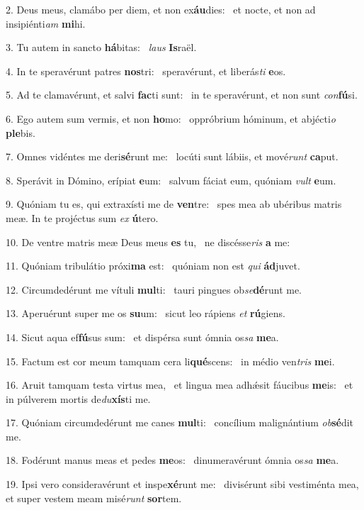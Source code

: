2. Deus meus, clamábo per diem, et non ex\textbf{áu}dies: \ast\  et nocte, et non ad insipiénti\textit{am} \textbf{mi}hi.\

3. Tu autem in sancto \textbf{há}bitas: \ast\  \textit{laus} \textbf{Is}raël.\

4. In te speravérunt patres \textbf{nos}tri: \ast\  speravérunt, et liberás\textit{ti} \textbf{e}os.\

5. Ad te clamavérunt, et salvi \textbf{fac}ti sunt: \ast\  in te speravérunt, et non sunt \textit{con}\textbf{fú}si.\

6. Ego autem sum vermis, et non \textbf{ho}mo: \ast\  oppróbrium hóminum, et abjécti\textit{o} \textbf{ple}bis.\

7. Omnes vidéntes me deri\textbf{sé}runt me: \ast\  locúti sunt lábiis, et mové\textit{runt} \textbf{ca}put.\

8. Sperávit in Dómino, erípiat \textbf{e}um: \ast\  salvum fáciat eum, quóniam \textit{vult} \textbf{e}um.\

9. Quóniam tu es, qui extraxísti me de \textbf{ven}tre: \ast\  spes mea ab ubéribus matris meæ. In te projéctus sum \textit{ex} \textbf{ú}tero.\

10. De ventre matris meæ Deus meus \textbf{es} tu, \ast\  ne discésse\textit{ris} \textbf{a} me:\

11. Quóniam tribulátio próxi\textbf{ma} est: \ast\  quóniam non est \textit{qui} \textbf{ád}juvet.\

12. Circumdedérunt me vítuli \textbf{mul}ti: \ast\  tauri pingues ob\textit{se}\textbf{dé}runt me.\

13. Aperuérunt super me os \textbf{su}um: \ast\  sicut leo rápiens \textit{et} \textbf{rú}giens.\

14. Sicut aqua ef\textbf{fú}sus sum: \ast\  et dispérsa sunt ómnia os\textit{sa} \textbf{me}a.\

15. Factum est cor meum tamquam cera li\textbf{qué}scens: \ast\  in médio ven\textit{tris} \textbf{me}i.\

16. Aruit tamquam testa virtus mea, \dag\  et lingua mea adhǽsit fáucibus \textbf{me}is: \ast\  et in púlverem mortis de\textit{du}\textbf{xís}ti me.\

17. Quóniam circumdedérunt me canes \textbf{mul}ti: \ast\  concílium malignántium \textit{ob}\textbf{sé}dit me.\

18. Fodérunt manus meas et pedes \textbf{me}os: \ast\  dinumeravérunt ómnia os\textit{sa} \textbf{me}a.\

19. Ipsi vero consideravérunt et inspe\textbf{xé}runt me: \ast\  divisérunt sibi vestiménta mea, et super vestem meam misé\textit{runt} \textbf{sor}tem.\

